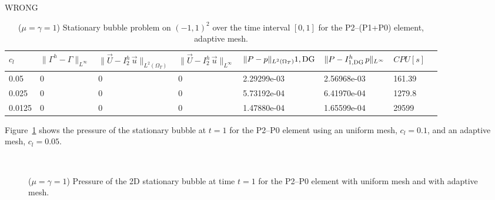 \documentclass[a4paper,12pt,onecolumn]{article}
\newcommand{\errorXx}{\|\Gamma^h - \Gamma\|_{L^\infty}}
\newcommand{\LerrorUu}[1]{\|\vec U - I^h_{#1}\,\vec u\|_{L^2(\Omega_T)}}
\newcommand{\errorUu}[1]{\|\vec U - I^h_{#1}\,\vec u\|_{L^\infty}}
\newcommand{\errorPp}[1]{\|P - I^h_{#1}\,p\|_{L^\infty}}
\newcommand{\LerrorPp}{\|P - p\|_{L^2(\Omega_T)}}
\begin{document}
\begin{table}
 \center
 WRONG
\begin{tabular}{llHlHlll}
\hline
$c_l$ & $\errorXx$ & $\LerrorUu2$ & $\errorUu2$ & $\LerrorPp{1,\rm{DG}}$ & $\errorPp{1,\rm{DG}}$ & $CPU[s]$ \\
 & 0 & 0 & 0 & 2.29299e-03 & 2.56968e-03 & 161.39\\
0.025 & 0 & 0 & 0 & 5.73192e-04 & 6.41970e-04 & 1279.8\\
0.0125 & 0 & 0 & 0 & 1.47880e-04 & 1.65599e-04 & 29599\\
\hline
\end{tabular}
\caption{($\mu=\gamma=1$) Stationary bubble problem on $(-1,1)^2$ over the time interval $[0,1]$ for the P2--(P1+P0) element, adaptive mesh.}
\label{tab:bubble2Dp2p1p0adaptive}
\end{table}

Figure~\ref{fig:2d_stationary_bubble} shows the pressure of the stationary bubble at $t=1$ for the P2--P0 element using an uniform mesh, $c_l=0.1$, and an adaptive mesh, $c_l=0.05$.
\begin{figure}[htbp]
  \centering
  \quad
  \\
  \caption{($\mu=\gamma=1$) Pressure of the 2D stationary bubble at time $t=1$ for the P2--P0 element with uniform mesh and with adaptive mesh.}
  \label{fig:2d_stationary_bubble}
\end{figure}
\end{document}
